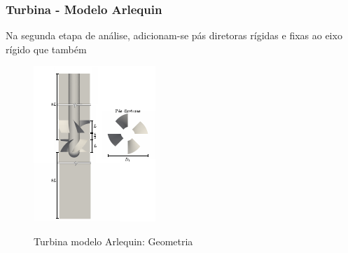 \begin{figure}[!htbp]
	\label{fig:turbina_mono_press}
\end{figure}


\subsubsection{Turbina - Modelo Arlequin}

Na segunda etapa de análise, adicionam-se pás diretoras rígidas e fixas ao eixo rígido que também 

\begin{figure}[!htbp]
	\caption{Turbina modelo Arlequin: Geometria}
	\centering 
	\includegraphics[scale=3.0,trim=0cm 0cm 0cm 0cm, clip=true]{Imagens/Cap7/turbina_arlq_geo.pdf}	
	\label{fig:turbina_arlq_geo}
\end{figure}

